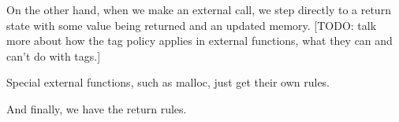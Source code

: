 \documentclass{llncs}
\begin{document}
\callstep

On the other hand, when we make an external call, we step directly to a return state with some value
being returned and an updated memory. [TODO: talk more about how the tag policy applies in external
  functions, what they can and can't do with tags.]

\extcallstep

Special external functions, such as malloc, just get their own rules.

\mallocstep

And finally, we have the return rules.

\returnstep
\retvalstep
\retnovalstep


  
\end{document}
